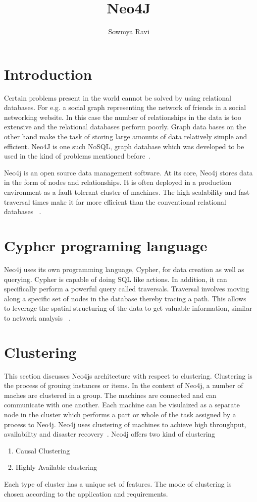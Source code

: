 \documentclass[9pt,twocolumn,twoside]{../../styles/osajnl}
\title{Neo4J}
\author[1]{Sowmya Ravi}
\affil[1]{School of Informatics and Computing, Bloomington, IN 47408, U.S.A.}
\affil[*]{Corresponding authors: sowravi@iu.edu.com}
\begin{document}
\maketitle

\section{Introduction}
Certain problems present in the world cannot be solved by using relational databases. For e.g. a social graph representing the network of friends in a social networking website. In this case the number of relationships in the data is too extensive and the relational databases perform poorly. Graph data bases on the other hand make the task of storing large amounts of data relatively simple and efficient. Neo4J is one such NoSQL, graph database which was developed to be used in the kind of problems mentioned before~\cite{www-neo4j-intro2}.

Neo4j is an open source data management software. At its core, Neo4j stores data in the form of nodes and relationships. It is often deployed in a production environment as a fault tolerant cluster of machines. The high scalability and fast traversal times make it far more efficient than the conventional relational databases ~\cite{www-neo4j-intro}. 

\section{Cypher programing language}
Neo4j uses its own programming language, 
Cypher, for data creation as well as querying. Cypher is capable of doing SQL like actions. In addition, it can specifically perform a powerful query called traversals. Traversal involves moving along a specific set of nodes in the database thereby tracing a path. This allows to leverage the spatial structuring of the data to get valuable information, similar to network 
analysis ~\cite{www-slideshare}. 

\section{Clustering }
This section discusses Neo4js architecture with respect to clustering. Clustering is the process of grouing instances or items. In the context of Neo4j, a number of maches are clustered in a group. The machines are connected and can communicate with one another. Each machine can be visulaized as a separate node in the cluster which performs a part or whole of the task assigned by a process to Neo4j. Neo4j uses clustering of machines to achieve high throughput, availability and disaster recovery~\cite{www-neo4j}. Neo4j offers two kind of clustering 
\begin{enumerate}
    \item Causal Clustering
    \item Highly Available clustering
\end{enumerate}
Each type of cluster has a unique set of features. The mode of clustering is chosen according to the application and requirements. 
\end{document}
